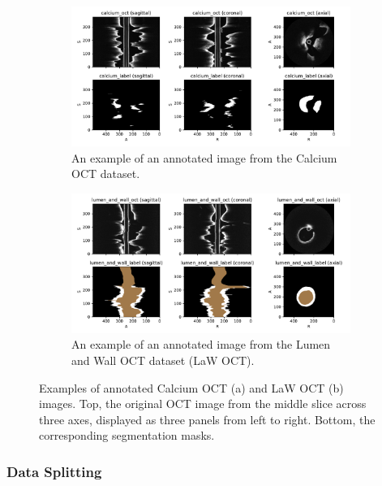 \documentclass[a4paper,11pt,oneside]{report}
\begin{document}
\begin{figure}[hbt]
    \begin{subfigure}[t]{0.49\textwidth}
        \centering
        \includegraphics[width=1\linewidth]{figures/fig_datasets_calcium_oct_sample.pdf}
        \caption{An example of an annotated image from the Calcium OCT dataset.}
        \label{fig:calcium-oct}
    \end{subfigure}%
    \hfill
    \begin{subfigure}[t]{0.49\textwidth}
        \centering
        \includegraphics[width=1\linewidth]{figures/fig_datasets_law_oct_sample.pdf}
        \caption{An example of an annotated image from the Lumen and Wall OCT dataset (LaW OCT).}
        \label{fig:lumen-and-wall-oct}
    \end{subfigure}
    \caption{Examples of annotated Calcium OCT (a) and LaW OCT (b) images. Top, the original OCT image from the middle slice across three axes, displayed as three panels from left to right. Bottom, the corresponding segmentation masks.}
    \label{fig:annotated-oct}
\end{figure}

\subsubsection{Data Splitting}
\end{document}

